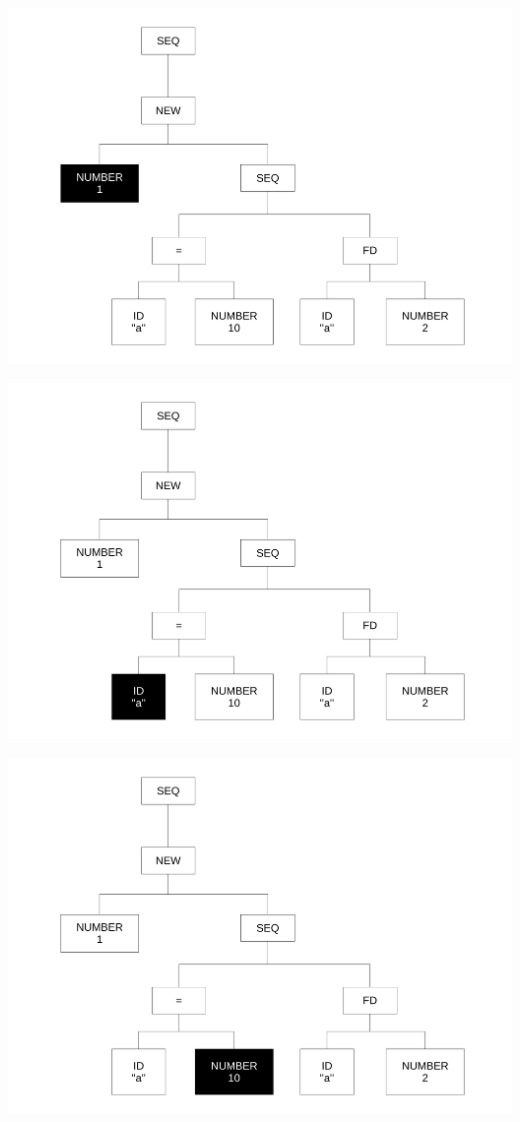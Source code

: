 \begin{frame}
\includegraphics[scale=0.3]{doc/Presentation/img/arbre1.pdf}
\end{frame}

\begin{frame}
\includegraphics[scale=0.3]{doc/Presentation/img/arbre2.pdf}
\end{frame}

\begin{frame}
\includegraphics[scale=0.3]{doc/Presentation/img/arbre3.pdf}
\end{frame}

